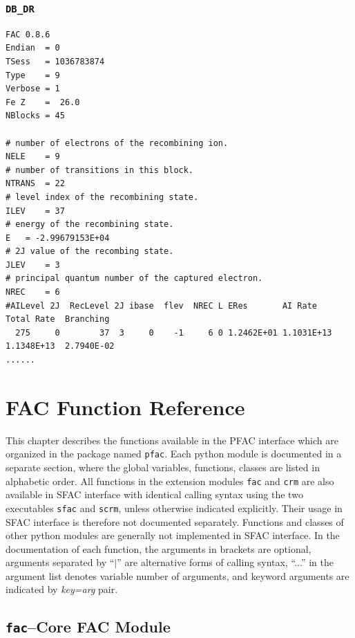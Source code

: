 \documentclass[twoside,letterpaper]{refrep}
\newcommand{\var}[1]{\textit{#1}}
\newcommand{\mod}[1]{\texttt{#1}}
\begin{document}
\subsection{\texttt{DB\_DR}}
\begin{verbatim}FAC 0.8.6
Endian	= 0
TSess	= 1036783874
Type	= 9
Verbose	= 1
Fe Z	=  26.0
NBlocks	= 45

# number of electrons of the recombining ion.
NELE	= 9
# number of transitions in this block.
NTRANS	= 22
# level index of the recombining state.
ILEV	= 37
# energy of the recombining state.
E	= -2.99679153E+04
# 2J value of the recombing state.
JLEV	= 3
# principal quantum number of the captured electron.
NREC	= 6
#AILevel 2J  RecLevel 2J ibase  flev  NREC L ERes       AI Rate     Total Rate  Branching
  275     0        37  3     0    -1     6 0 1.2462E+01 1.1031E+13  1.1348E+13  2.7940E-02
......
\end{verbatim}

\chapter{FAC Function Reference}
\label{cha:function}
This chapter describes the functions available in the PFAC interface which are
organized in the package named \mod{pfac}. Each
python module is documented in a separate section, where the global variables,
functions, classes are listed in alphabetic order. All functions in the
extension modules \mod{fac} and \mod{crm} are also available in SFAC interface
with identical calling syntax using the two executables \mod{sfac} and
\mod{scrm}, unless otherwise indicated explicitly. Their usage in SFAC
interface is therefore not documented separately. Functions and classes of
other python modules are generally not implemented in SFAC interface. In the
documentation of each function, the arguments in brackets are optional,
arguments separated by ``$|$'' are alternative forms of calling syntax,
``...'' in the argument list denotes variable number of arguments, and
keyword arguments are indicated by \var{key=arg} pair.

\section{\mod{fac}--Core FAC Module}
\label{sec:fac}
\end{document}
